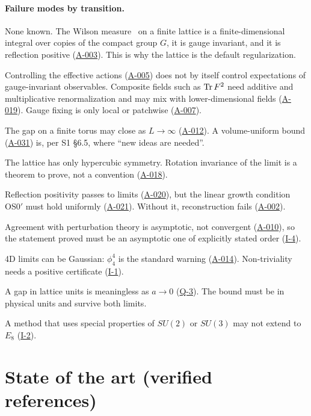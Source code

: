 \documentclass[11pt,a4paper]{article}
\newcommand{\idref}[1]{\hyperref[#1]{\textsf{#1}}}
\begin{document}
\paragraph{Failure modes by transition.}
\begin{description}[font=\normalfont\sffamily,leftmargin=1.1cm,labelwidth=0.9cm,align=left]
\item[T1] None known. The Wilson measure~\cite{Wil74} on a finite lattice is a finite-dimensional integral over copies of the compact group $G$, it is gauge invariant, and it is reflection positive (\idref{A-003}). This is why the lattice is the default regularization.
\item[T2] Controlling the effective actions (\idref{A-005}) does not by itself control expectations of gauge-invariant observables. Composite fields such as $\operatorname{Tr} F^2$ need additive and multiplicative renormalization and may mix with lower-dimensional fields (\idref{A-019}). Gauge fixing is only local or patchwise (\idref{A-007}).
\item[T3] The gap on a finite torus may close as $L\to\infty$ (\idref{A-012}). A volume-uniform bound (\idref{A-031}) is, per S1 \S6.5, where \enquote{new ideas are needed}.
\item[T4] The lattice has only hypercubic symmetry. Rotation invariance of the limit is a theorem to prove, not a convention (\idref{A-018}).
\item[T5] Reflection positivity passes to limits (\idref{A-020}), but the linear growth condition OS0$'$ must hold uniformly (\idref{A-021}). Without it, reconstruction fails (\idref{A-002}).
\item[T6] Agreement with perturbation theory is asymptotic, not convergent (\idref{A-010}), so the statement proved must be an asymptotic one of explicitly stated order (\idref{I-4}).
\item[T7] 4D limits can be Gaussian: $\phi^4_4$ is the standard warning (\idref{A-014}). Non-triviality needs a positive certificate (\idref{I-1}).
\item[T8] A gap in lattice units is meaningless as $a\to0$ (\idref{Q-3}). The bound must be in physical units and survive both limits.
\item[T9] A method that uses special properties of $SU(2)$ or $SU(3)$ may not extend to $E_8$ (\idref{I-2}).
\end{description}

\section{State of the art (verified references)}\label{sec:sota}
\end{document}
